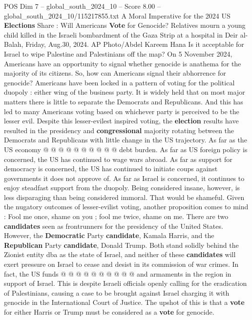\begin{textsample}{POS Dim 7 – global\_south\_2024\_10 – Score 8.00 – global\_south\_2024\_10/115217855.txt}  \label{ex:f7_pos_222}
A Moral Imperative for the 2024 US \textbf{Elections} Share : Will Americans \textbf{Vote} for Genocide?
Relatives mourn a young child killed in the Israeli bombardment of the Gaza Strip at a hospital in Deir al-Balah, Friday, Aug.30, 2024.
AP Photo/Abdel Kareem Hana Is it acceptable for Israel to wipe Palestine and Palestinians off the map?
On 5 November 2024, Americans have an opportunity to signal whether genocide is anathema for the majority of its citizens.
So, how can Americans signal their abhorrence for genocide?
Americans have been locked in a pattern of voting for the political duopoly : either wing of the business party.
It is widely held that on most major matters there is little to separate the Democrats and Republicans.
And this has led to many Americans voting based on whichever party is perceived to be the lesser evil.
Despite this lesser-evilest inspired voting, the \textbf{election} results have resulted in the presidency and \textbf{congressional} majority rotating between the Democrats and Republicans with little change in the US trajectory.
As far as the US economy @ @ @ @ @ @ @ @ @ @ debt burden.
As far as US foreign policy is concerned, the US has continued to wage wars abroad.
As far as support for democracy is concerned, the US has continued to initiate coups against governments it does not approve of.
As far as Israel is concerned, it continues to enjoy steadfast support from the duopoly.
Being considered insane, however, is less disparaging than being considered immoral.
That would be shameful.
Given the nugatory outcomes of lesser-evilist voting, another proposition comes to mind : Fool me once, shame on you ; fool me twice, shame on me.
There are two \textbf{candidates} seen as frontrunners for the presidency of the United States.
However, the \textbf{Democratic} Party \textbf{candidate}, Kamala Harris, and the \textbf{Republican} Party \textbf{candidate}, Donald Trump.
Both stand solidly behind the Zionist entity dba as the state of Israel, and neither of these \textbf{candidates} will exert pressure on Israel to cease and desist in its commission of war crimes.
In fact, the US funds @ @ @ @ @ @ @ @ @ @ and armaments in the region in support of Israel.
This is despite Israeli officials openly calling for the eradication of Palestinians, causing a case to be brought against Israel charging it with genocide in the International Court of Justice.
The upshot of this is that a \textbf{vote} for either Harris or Trump must be considered as a \textbf{vote} for genocide.

\end{textsample}
